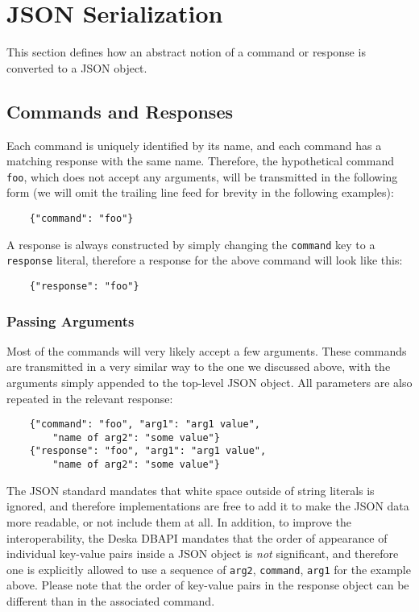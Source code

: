 \documentclass{article}
\begin{document}
\section{JSON Serialization}

This section defines how an abstract notion of a command or response is converted to a JSON object.

\subsection{Commands and Responses}

Each command is uniquely identified by its name, and each command has a matching response with the same name. Therefore,
the hypothetical command {\tt foo}, which does not accept any arguments, will be transmitted in the following form (we
will omit the trailing line feed for brevity in the following examples):

\begin{lstlisting}
    {"command": "foo"}
\end{lstlisting}

A response is always constructed by simply changing the {\tt command} key to a {\tt response} literal, therefore a
response for the above command will look like this:

\begin{lstlisting}
    {"response": "foo"}
\end{lstlisting}

\subsubsection{Passing Arguments}

Most of the commands will very likely accept a few arguments.  These commands are transmitted in a very similar way to
the one we discussed above, with the arguments simply appended to the top-level JSON object.  All parameters are also
repeated in the relevant response:

\begin{lstlisting}
    {"command": "foo", "arg1": "arg1 value",
        "name of arg2": "some value"}
    {"response": "foo", "arg1": "arg1 value",
        "name of arg2": "some value"}
\end{lstlisting}

The JSON standard mandates that white space outside of string literals is ignored, and therefore implementations are
free to add it to make the JSON data more readable, or not include them at all.  In addition, to improve the
interoperability, the Deska DBAPI mandates that the order of appearance of individual key-value pairs inside a JSON
object is {\em not} significant, and therefore one is explicitly allowed to use a sequence of {\tt arg2}, {\tt command},
{\tt arg1} for the example above.  Please note that the order of key-value pairs in the response object can be different
than in the associated command.
\end{document}
